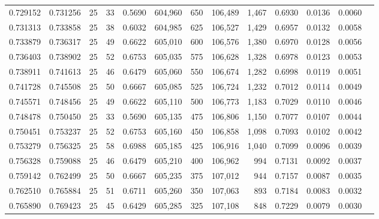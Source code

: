 \begin{tabular}{rrrrrrrrrrrrr}
0.729152 & 0.731256 &    25 &  33 &                                     0.5690 & 604,960 &     650 & 106,489 &   1,467 & 0.6930 & 0.0136 & 0.0060 \\
0.731313 & 0.733858 &    25 &  38 &                                     0.6032 & 604,985 &     625 & 106,527 &   1,429 & 0.6957 & 0.0132 & 0.0058 \\
0.733879 & 0.736317 &    25 &  49 &                                     0.6622 & 605,010 &     600 & 106,576 &   1,380 & 0.6970 & 0.0128 & 0.0056 \\
0.736403 & 0.738902 &    25 &  52 &                                     0.6753 & 605,035 &     575 & 106,628 &   1,328 & 0.6978 & 0.0123 & 0.0053 \\
0.738911 & 0.741613 &    25 &  46 &                                     0.6479 & 605,060 &     550 & 106,674 &   1,282 & 0.6998 & 0.0119 & 0.0051 \\
0.741728 & 0.745508 &    25 &  50 &                                     0.6667 & 605,085 &     525 & 106,724 &   1,232 & 0.7012 & 0.0114 & 0.0049 \\
0.745571 & 0.748456 &    25 &  49 &                                     0.6622 & 605,110 &     500 & 106,773 &   1,183 & 0.7029 & 0.0110 & 0.0046 \\
0.748478 & 0.750450 &    25 &  33 &                                     0.5690 & 605,135 &     475 & 106,806 &   1,150 & 0.7077 & 0.0107 & 0.0044 \\
0.750451 & 0.753237 &    25 &  52 &                                     0.6753 & 605,160 &     450 & 106,858 &   1,098 & 0.7093 & 0.0102 & 0.0042 \\
0.753279 & 0.756325 &    25 &  58 &                                     0.6988 & 605,185 &     425 & 106,916 &   1,040 & 0.7099 & 0.0096 & 0.0039 \\
0.756328 & 0.759088 &    25 &  46 &                                     0.6479 & 605,210 &     400 & 106,962 &     994 & 0.7131 & 0.0092 & 0.0037 \\
0.759142 & 0.762499 &    25 &  50 &                                     0.6667 & 605,235 &     375 & 107,012 &     944 & 0.7157 & 0.0087 & 0.0035 \\
0.762510 & 0.765884 &    25 &  51 &                                     0.6711 & 605,260 &     350 & 107,063 &     893 & 0.7184 & 0.0083 & 0.0032 \\
0.765890 & 0.769423 &    25 &  45 &                                     0.6429 & 605,285 &     325 & 107,108 &     848 & 0.7229 & 0.0079 & 0.0030 \\

\end{tabular}
